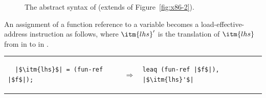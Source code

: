 \documentclass[7x10]{TimesAPriori_MIT}%
\newcommand{\gray}[1]{{\color{gray} #1}}
\def\racketEd{0}
\def\pythonEd{1}
\def\edition{1}
\begin{document}
\begin{figure}[tp]
\fbox{
  \begin{minipage}{0.96\textwidth}
    \small
{\if\edition\racketEd
\[
\begin{array}{lcl}
  \Arg &::=&  \gray{  \INT{\Int} \MID \REG{\Reg} \MID \DEREF{\Reg}{\Int}
     \MID \BYTEREG{\Reg} } \\
     &\MID& \gray{ \GLOBAL{\Var} } \MID \FUNREF{\itm{label}} \\
  \Instr &::=& \ldots \MID \INDCALLQ{\Arg}{\itm{int}}
    \MID \TAILJMP{\Arg}{\itm{int}}\\
    &\MID& \BININSTR{\code{'leaq}}{\Arg}{\REG{\Reg}}\\
  \Block &::= & \BLOCK{\itm{info}}{\LP\Instr\ldots\RP}\\
  \Def &::= & \DEF{\itm{label}}{\code{'()}}{\Type}{\itm{info}}{\LP\LP\itm{label}\,\key{.}\,\Block\RP\ldots\RP} \\
\LangXIndCallM{} &::= & \PROGRAMDEFS{\itm{info}}{\LP\Def\ldots\RP}
\end{array}
\]
\fi}
{\if\edition\pythonEd
\[
\begin{array}{lcl}
  \Arg &::=&  \gray{  \INT{\Int} \MID \REG{\Reg} \MID \DEREF{\Reg}{\Int}
     \MID \BYTEREG{\Reg} } \\
     &\MID& \gray{ \GLOBAL{\Var} } \MID \FUNREF{\itm{label}} \\
  \Instr &::=& \ldots \MID \INDCALLQ{\Arg}{\itm{int}}
    \MID \TAILJMP{\Arg}{\itm{int}}\\
    &\MID& \BININSTR{\code{leaq}}{\Arg}{\REG{\Reg}}\\
  \Def &::= & \DEF{\itm{label}}{\LS\RS}{\LC\itm{label}\key{:}\,\Instr^{*}\code{,}\ldots\RC}{\_}{\Type}{\_} \\
\LangXIndCallM{} &::= & \XPROGRAMDEFS{\LS\Def\code{,}\ldots\RS}
\end{array}
\]
\fi}
\end{minipage}
}
\caption{The abstract syntax of \LangXIndCall{} (extends
  \LangXGlobal{} of Figure~\ref{fig:x86-2}).}
\label{fig:x86-3}
\end{figure}


An assignment of a function reference to a variable becomes a
load-effective-address instruction as follows, where $\itm{lhs}'$
is the translation of $\itm{lhs}$ from \Atm{} in \LangCFun{}
to \Arg{} in \LangXIndCallVar{}. \\
\begin{tabular}{lcl}
\begin{minipage}{0.35\textwidth}
\begin{lstlisting}
  |$\itm{lhs}$| = (fun-ref |$f$|);
\end{lstlisting}
\end{minipage}
&
$\Rightarrow$\qquad\qquad
&
\begin{minipage}{0.3\textwidth}
\begin{lstlisting}
leaq (fun-ref |$f$|), |$\itm{lhs}'$|
\end{lstlisting}
\end{minipage}
\end{tabular} \\
\end{document}
